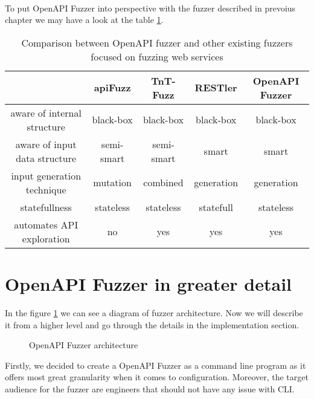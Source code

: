\paragraph{}
To put OpenAPI Fuzzer into perspective with the fuzzer described in prevoius chapter we may have a look at the table \ref{table:openapi-fuzzers-comparison}.

\begin{table}[h]
\begin{center}
\begin{tabular}{|c|c c c c|}
\hline
                              & apiFuzz    & TnT-Fuzz   & RESTler    & \textbf{OpenAPI Fuzzer} \\
\hline
aware of internal structure   & black-box  & black-box  & black-box  & black-box               \\
aware of input data structure & semi-smart & semi-smart & smart      & smart                   \\
input generation technique    & mutation   & combined   & generation & generation              \\
statefullness                 & stateless  & stateless  & statefull  & stateless               \\
automates API exploration     & no         & yes        & yes        & yes                     \\
\hline
\end{tabular}
\caption{Comparison between OpenAPI fuzzer and other existing fuzzers focused on fuzzing web services}
\label{table:openapi-fuzzers-comparison}
\end{center}
\end{table}


\section{OpenAPI Fuzzer in greater detail}
In the figure \ref{fig:fuzzer-architecture} we can see a diagram of fuzzer architecture. Now we will describe it from a higher level and go through the details in the implementation section.

\begin{figure}[h]
    \center
    \def\svgwidth{\columnwidth}
    \scalebox{0.7}{}
    \caption{OpenAPI Fuzzer architecture}
    \label{fig:fuzzer-architecture}
\end{figure}

Firstly, we decided to create a OpenAPI Fuzzer as a command line program as it offers most great granularity when it comes to configuration. Moreover, the target audience for the fuzzer are engineers that should not have any issue with CLI.

